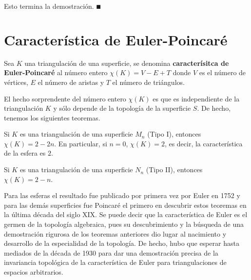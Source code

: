 \documentclass[GTS.tex]{subfiles}
\begin{document}
\begin{dem}
\begin{enumerate}
\end{enumerate}
Esto termina la demostración. $\QED$
\end{dem}


\vspace{1cm}

\section{Característica de Euler-Poincaré}

\begin{defi} Sea $K$ una triangulación de una superficie, se denomina \textbf{caracterísitca de Euler-Poincaré} al número entero $\chi(K)=V-E+T$  %
donde $V$ es el número de vértices, $E$ el número de aristas y $T$ el número de triángulos. %
\end{defi}

El hecho sorprendente del número entero $\chi(K)$ es que es independiente de la triangulación $K$ y sólo depende de la topología de la superficie $S$. De hecho, tenemos los siguientes teoremas.

\begin{teorema}
Si $K$ es una triangulación de una superficie $M_n$ (Tipo I), entonces $\chi(K)=2-2n$. En particular, si $n=0$, $\chi(K)=2$, es decir, la característica de la esfera es $2$.
\end{teorema}

\begin{teorema}\label{542}
Si $K$ es una triangulación de una superficie $N_n$ (Tipo II), entonces $\chi(K)=2-n$.
\end{teorema}

Para las esferas el resultado fue publicado por primera vez por Euler en 1752 y para las demás superficies fue Poincaré el primero en descubrir estos teoremas en la última década del siglo XIX. Se puede decir que la característica de Euler es el germen de la topología algebraica, pues su descubrimiento y la búsqueda de una demostración rigurosa de los teoremas anteriores dio lugar al nacimiento y desarrollo de la especialidad de la topología. De hecho, hubo que esperar hasta mediados de la década de 1930 para dar una demostración precisa de la invariancia topológica de la característica de Euler para triangulaciones de espacios arbitrarios.
\end{document}
